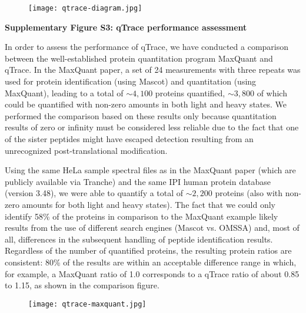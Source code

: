\documentclass[11pt,letterpaper]{article}
\begin{document}
\begin{figure}[h]
\texttt{[image: qtrace-diagram.jpg]}
\end{figure}

\clearpage

{\bf \LARGE Supplementary Figure S3: qTrace performance assessment}

In order to assess the performance of qTrace, we have conducted a comparison 
between the well-established protein quantitation program 
MaxQuant and qTrace. In the 
MaxQuant paper, a set of 24 measurements with three repeats was used for protein 
identification (using Mascot) and quantitation (using MaxQuant), leading to a 
total of $\sim4,100$ proteins quantified, $\sim3,800$ of which could be 
quantified with non-zero amounts in both light and heavy states. We performed 
the comparison based on these results only because quantitation results of 
zero or infinity must be considered less reliable due to the fact that one of 
the sister peptides might have escaped detection resulting from an unrecognized 
post-translational modification.

Using the same HeLa sample spectral files as in the MaxQuant paper (which are 
publicly available via Tranche) and the same IPI human protein database 
(version 3.48), we were able to quantify a total of $\sim2,200$ proteins (also 
with non-zero amounts for both light and heavy states). The fact that we could 
only identify 58\% of the proteins in comparison to the MaxQuant example likely 
results from the use of different search engines (Mascot vs. OMSSA) and, most 
of all, differences in the subsequent handling of peptide identification results. 
Regardless of the number of quantified proteins, the resulting protein ratios 
are consistent: 80\% of the results are within an acceptable difference range 
in which, for example, a MaxQuant ratio of 1.0 corresponds to a qTrace ratio of 
about 0.85 to 1.15, as shown in the comparison figure.

\begin{figure}[h]
\texttt{[image: qtrace-maxquant.jpg]}
\end{figure}

\clearpage

\begin{onehalfspacing}
\end{onehalfspacing}
\end{document}
